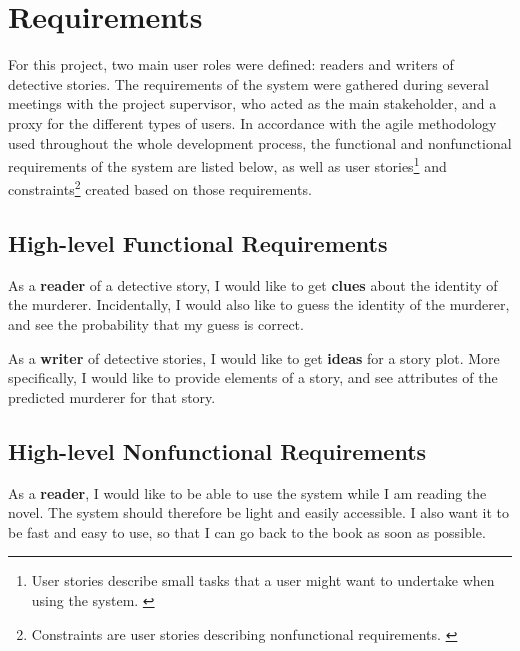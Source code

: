 \documentclass{mproj}
\begin{document}
\chapter{Requirements}

For this project, two main user roles were defined: readers and writers of detective stories. The requirements of the system were gathered during several meetings with the project supervisor, who acted as the main stakeholder, and a proxy for the different types of users. 
In accordance with the agile methodology used throughout the whole development process, the functional and nonfunctional requirements of the system are listed below, as well as user stories\footnote{User stories describe small tasks that a user might want to undertake when using the system. \cite[Chapter~1]{userstoriesbook}} and constraints\footnote{Constraints are user stories describing nonfunctional requirements. \cite{userstoriesbook}} created based on those requirements. 


\section{High-level Functional Requirements}
	
As a \textbf{reader} of a detective story, I would like to get \textbf{clues} about the identity of the murderer. Incidentally, I would also like to guess the identity of the murderer, and see the probability that my guess is correct. \par

As a \textbf{writer} of detective stories, I would like to get \textbf{ideas} for a story plot. More specifically, I would like to provide elements of a story, and see attributes of the predicted murderer for that story.\par

\section{High-level Nonfunctional Requirements}
	
As a \textbf{reader}, I would like to be able to use the system while I am reading the novel. The system should therefore be light and easily accessible. I also want it to be fast and easy to use, so that I can go back to the book as soon as possible. 

\end{document}
